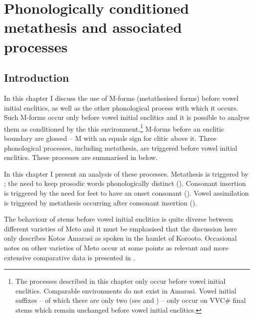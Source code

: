 \chapter{Phonologically conditioned metathesis and associated processes}\label{ch:PhoMet}

\section{Introduction}\label{sec:Int ch:PhoMet}
In this chapter I discuss the use of M-forms (metathesised forms)
before vowel initial enclitics,
as well as the other phonological process with which it occurs.
Such M-forms occur only before vowel initial enclitics
and it is possible to analyse them as conditioned by the this environment.\footnote{
		The processes described in this chapter only occur before vowel initial enclitics.
		Comparable environments do not exist in Amarasi.
		Vowel initial suffixes -- of which there are only two
		(see  and ) --
		only occur on VVC{\#} final stems
		which remain unchanged before vowel initial enclitics.}
M-forms before an enclitic boundary are glossed {\Mvv}
-- M with an equals sign for clitic above it.
Three phonological processes, including metathesis,
are triggered before vowel initial enclitics.
These processes are summarised in  below.

\begin{exe}
	\label{ex:ProEncBou}
	\begin{xlist}
	\end{xlist}
\end{exe}

In this chapter I present an analysis of these processes.
Metathesis is triggered by ;
the need to keep prosodic words phonologically distinct ().
Consonant insertion is triggered by the need for feet to have an onset consonant ().
Vowel assimilation is triggered by metathesis occurring after consonant insertion ().

The behaviour of stems before vowel initial enclitics
is quite diverse between different varieties of Meto
and it must be emphasised that the discussion here
only describes Kotos Amarasi as spoken in the hamlet of Koro{\Q}oto.
Occasional notes on other varieties of Meto occur at some points as relevant
and more extensive comparative data is presented in .

